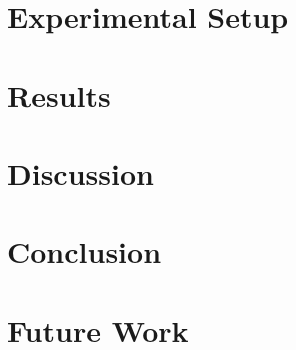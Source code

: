 \documentclass{article}
\begin{document}
\section{Experimental Setup}

\section{Results}

\section{Discussion}

\section{Conclusion}

\section{Future Work}


\end{document}
